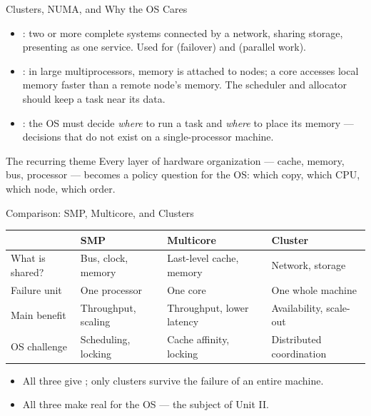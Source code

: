 \documentclass[aspectratio=169]{beamer}
\begin{document}
\begin{frame}{Clusters, NUMA, and Why the OS Cares}
  \begin{itemize}
    \item {}: two or more complete systems connected by a network,
      sharing storage, presenting as one service. Used for  (failover) and  (parallel
      work).
    \item {}: in large multiprocessors,
      memory is attached to nodes; a core accesses local memory faster than a
      remote node's memory. The scheduler and allocator should keep a task near
      its data.
    \item {}: the OS must decide \emph{where} to run a task
      and \emph{where} to place its memory --- decisions that do not exist on a
      single-processor machine.
  \end{itemize}
  \vspace{0.2cm}
  \begin{alertblock}{The recurring theme}
    Every layer of hardware organization --- cache, memory, bus, processor ---
    becomes a policy question for the OS: which copy, which CPU, which node,
    which order.
  \end{alertblock}
\end{frame}

\begin{frame}{Comparison: SMP, Multicore, and Clusters}
  \centering
  \small
  \setlength{\tabcolsep}{4pt}
  \begin{tabular}{@{}>{\raggedright\arraybackslash}p{2.2cm}
      >{\raggedright\arraybackslash}p{3.1cm}
      >{\raggedright\arraybackslash}p{3.3cm}
      >{\raggedright\arraybackslash}p{3.9cm}@{}}
    \toprule
    & \textbf{SMP} & \textbf{Multicore} & \textbf{Cluster} \\
    \midrule
    What is shared? & Bus, clock, memory & Last-level cache, memory & Network, storage \\
    Failure unit & One processor & One core & One whole machine \\
    Main benefit & Throughput, scaling & Throughput, lower latency & Availability, scale-out \\
    OS challenge & Scheduling, locking & Cache affinity, locking & Distributed coordination \\
    \bottomrule
  \end{tabular}
  \vspace{0.35cm}
  \begin{itemize}
    \item All three give ; only clusters survive the failure of
      an entire machine.
    \item All three make  real for the OS --- the subject of
      Unit II.
  \end{itemize}
\end{frame}
\end{document}
